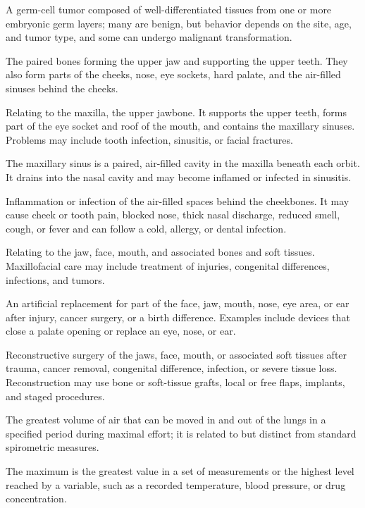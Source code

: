  A germ-cell tumor composed of well-differentiated tissues from one or more embryonic germ layers; many are benign, but behavior depends on the site, age, and tumor type, and some can undergo malignant transformation.

 The paired bones forming the upper jaw and supporting the upper teeth. They also form parts of the cheeks, nose, eye sockets, hard palate, and the air-filled sinuses behind the cheeks.

 Relating to the maxilla, the upper jawbone. It supports the upper teeth, forms part of the eye socket and roof of the mouth, and contains the maxillary sinuses. Problems may include tooth infection, sinusitis, or facial fractures.

 The maxillary sinus is a paired, air-filled cavity in the maxilla beneath each orbit. It drains into the nasal cavity and may become inflamed or infected in sinusitis.

 Inflammation or infection of the air-filled spaces behind the cheekbones. It may cause cheek or tooth pain, blocked nose, thick nasal discharge, reduced smell, cough, or fever and can follow a cold, allergy, or dental infection.

 Relating to the jaw, face, mouth, and associated bones and soft tissues. Maxillofacial care may include treatment of injuries, congenital differences, infections, and tumors.

 An artificial replacement for part of the face, jaw, mouth, nose, eye area, or ear after injury, cancer surgery, or a birth difference. Examples include devices that close a palate opening or replace an eye, nose, or ear.

 Reconstructive surgery of the jaws, face, mouth, or associated soft tissues after trauma, cancer removal, congenital difference, infection, or severe tissue loss. Reconstruction may use bone or soft-tissue grafts, local or free flaps, implants, and staged procedures.

 The greatest volume of air that can be moved in and out of the lungs in a specified period during maximal effort; it is related to but distinct from standard spirometric measures.

 The maximum is the greatest value in a set of measurements or the highest level reached by a variable, such as a recorded temperature, blood pressure, or drug concentration.

